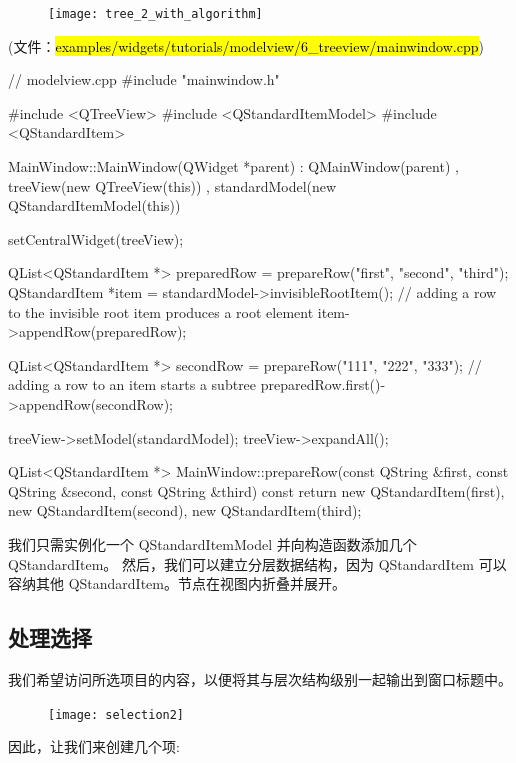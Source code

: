 \begin{figure}[hbt!]  
\texttt{[image: tree\_2\_with\_algorithm]}
\end{figure}

(文件：\hl{examples/widgets/tutorials/modelview/6\_treeview/mainwindow.cpp})

\begin{cppcode}
// modelview.cpp
#include "mainwindow.h"

#include <QTreeView>
#include <QStandardItemModel>
#include <QStandardItem>

MainWindow::MainWindow(QWidget *parent)
    : QMainWindow(parent)
    , treeView(new QTreeView(this))
    , standardModel(new QStandardItemModel(this))
{
    setCentralWidget(treeView);

    QList<QStandardItem *> preparedRow = prepareRow("first", "second", "third");
    QStandardItem *item = standardModel->invisibleRootItem();
    // adding a row to the invisible root item produces a root element
    item->appendRow(preparedRow);

    QList<QStandardItem *> secondRow = prepareRow("111", "222", "333");
    // adding a row to an item starts a subtree
    preparedRow.first()->appendRow(secondRow);

    treeView->setModel(standardModel);
    treeView->expandAll();
}

QList<QStandardItem *> MainWindow::prepareRow(const QString &first,
                                              const QString &second,
                                              const QString &third) const
{
    return {new QStandardItem(first),
            new QStandardItem(second),
            new QStandardItem(third)};
}
\end{cppcode}

我们只需实例化一个 QStandardItemModel 并向构造函数添加几个 QStandardItem。
然后，我们可以建立分层数据结构，因为 QStandardItem 可以容纳其他 QStandardItem。节点在视图内折叠并展开。

\subsection{处理选择}

我们希望访问所选项目的内容，以便将其与层次结构级别一起输出到窗口标题中。

\begin{figure}[hbt!]  
\texttt{[image: selection2]}
\end{figure}

因此，让我们来创建几个项:

